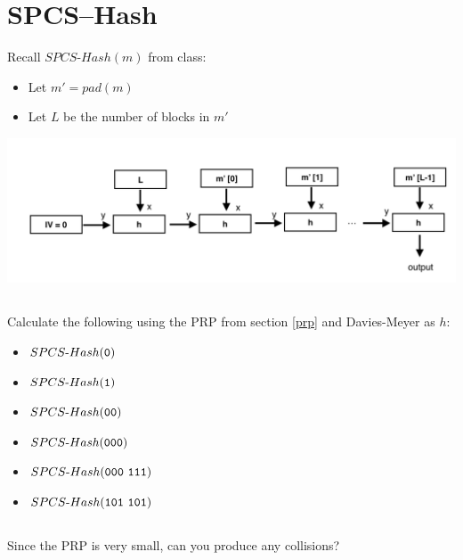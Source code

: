 \documentclass[12pt]{article}
\begin{document}
\newpage
\section{SPCS--Hash}

Recall $SPCS\text{-}Hash(m)$ from class:

\begin{itemize}
\item Let $m' = pad(m)$
\item Let $L$ be the number of blocks in $m'$
\end{itemize}

\begin{center}
\includegraphics[width=15cm]{img/spcs-hash.png}
\end{center}

\subsection{}


Calculate the following using the PRP from section \ref{prp} and Davies-Meyer as $h$:

\begin{itemize}
\item $SPCS\text{-}Hash({\tt 0})$ 
\item $SPCS\text{-}Hash({\tt 1})$ 
\item $SPCS\text{-}Hash({\tt 00})$ 
\item $SPCS\text{-}Hash({\tt 000})$ 
\item $SPCS\text{-}Hash({\tt 000~111})$ 
\item $SPCS\text{-}Hash({\tt 101~101})$ 
\end{itemize}

\subsection{}

Since the PRP is very small, can you produce any collisions?
\end{document}
